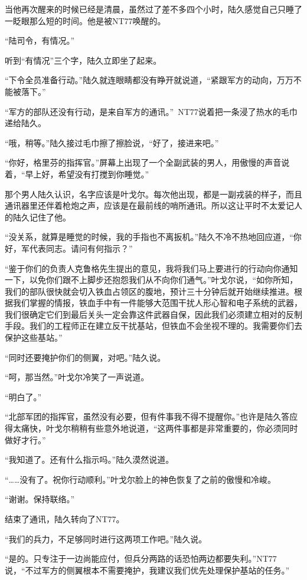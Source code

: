 当他再次醒来的时候已经是清晨，虽然过了差不多四个小时，陆久感觉自己只睡了一眨眼那么短的时间。他是被NT77唤醒的。

“陆司令，有情况。”

听到“有情况”三个字，陆久立即坐了起来。

“下令全员准备行动。”陆久就连眼睛都没有睁开就说道，“紧跟军方的动向，万万不能被落下。”

“军方的部队还没有行动，是来自军方的通讯。” NT77说着把一条浸了热水的毛巾递给陆久。

“哦，稍等。”陆久接过毛巾擦了擦脸说，“好了，接进来吧。”

“你好，格里芬的指挥官。”屏幕上出现了一个全副武装的男人，用傲慢的声音说着，“早上好，希望没有打搅到你睡觉。”

那个男人陆久认识，名字应该是叶戈尔。每次他出现，都是一副戎装的样子，而且通讯器里还伴着枪炮之声，应该是在最前线的哨所通讯。所以这让平时不太爱记人的陆久记住了他。

“没关系，就算是睡觉的时候，我的手指也不离扳机。”陆久不冷不热地回应道，“你好，军代表同志。请问有何指示？”

“鉴于你们的负责人克鲁格先生提出的意见，我将我们马上要进行的行动向你通知一下，以免你们跟不上脚步还抱怨我们从不向你们通气。”叶戈尔说，“如你所知，我们的部队很快就会切入铁血占领区的腹地，预计三十分钟后就开始继续推进。根据我们掌握的情报，铁血手中有一件能够大范围干扰人形心智和电子系统的武器，我们很确定它们到最后关头一定会靠这件武器自保，因此我们必须建立相对的反制手段。我们的工程师正在建立反干扰基站，但铁血不会坐视不理的。我需要你们去保护这些基站。”

“同时还要掩护你们的侧翼，对吧。”陆久说。

“呵，那当然。”叶戈尔冷笑了一声说道。

“明白了。”

“北部军团的指挥官，虽然没有必要，但有件事我不得不提醒你。”也许是陆久答应得太痛快，叶戈尔稍稍有些意外地说道，“这两件事都是非常重要的，你必须同时做好才行。”

“我知道了。还有什么指示吗。”陆久漠然说道。

“……没有了。祝你行动顺利。”叶戈尔脸上的神色恢复了之前的傲慢和冷峻。

“谢谢。保持联络。”

结束了通讯，陆久转向了NT77。

“我们的兵力，不足够同时进行这两项工作吧。”陆久说。

“是的。只专注于一边尚能应付，但兵分两路的话恐怕两边都要失利。”NT77说，“不过军方的侧翼根本不需要掩护，我建议我们优先处理保护基站的任务。”


